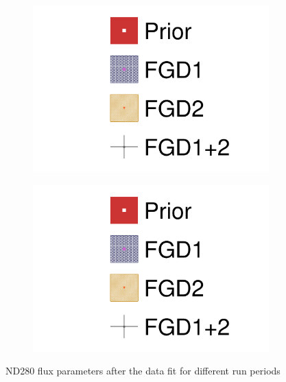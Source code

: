 \begin{figure}[h]
\begin{subfigure}[t]{0.24\textwidth}
		\includegraphics[width=\textwidth, trim={0mm 0mm 0mm 0mm}, clip,page=8]{figures/mach3/data/alt/2017b_FGD1_Data_merge_2017b_FGD2_Data_merge_2017b_NewData_NewDet_UpdXsecStep_2Xsec_4Det_5Flux_0}
	\end{subfigure}
	\begin{subfigure}[t]{0.24\textwidth}
		\includegraphics[width=\textwidth, trim={0mm 0mm 0mm 0mm}, clip,page=9]{figures/mach3/data/alt/2017b_FGD1_Data_merge_2017b_FGD2_Data_merge_2017b_NewData_NewDet_UpdXsecStep_2Xsec_4Det_5Flux_0}
	\end{subfigure}
	\caption{ND280 flux parameters after the data fit for different run periods}
	\label{fig:flux_data_nd280_fdg1vsfgd2}
\end{figure}

